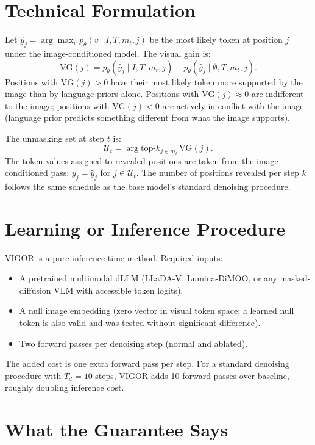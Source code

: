 \documentclass[10pt,twocolumn]{article}
\begin{document}
\section{Technical Formulation}

Let $\hat{y}_j = \arg\max_v p_\theta(v \mid I, T, m_t, j)$ be the most likely
token at position $j$ under the image-conditioned model. The visual gain is:
\[
  \text{VG}(j) = p_\theta(\hat{y}_j \mid I, T, m_t, j)
              - p_\theta(\hat{y}_j \mid \emptyset, T, m_t, j).
\]
Positions with $\text{VG}(j) > 0$ have their most likely token more supported
by the image than by language priors alone. Positions with $\text{VG}(j) \approx 0$
are indifferent to the image; positions with $\text{VG}(j) < 0$ are actively
in conflict with the image (language prior predicts something different from
what the image supports).

The unmasking set at step $t$ is:
\[
  \mathcal{U}_t = \arg\text{top-}k_{j \in m_t}\, \text{VG}(j).
\]
The token values assigned to revealed positions are taken from the
image-conditioned pass: $y_j = \hat{y}_j$ for $j \in \mathcal{U}_t$.
The number of positions revealed per step $k$ follows the same schedule as
the base model's standard denoising procedure.

\section{Learning or Inference Procedure}

VIGOR is a pure inference-time method. Required inputs:
\begin{itemize}[itemsep=2pt,parsep=0pt]
  \item A pretrained multimodal dLLM (LLaDA-V, Lumina-DiMOO, or any masked-
    diffusion VLM with accessible token logits).
  \item A null image embedding (zero vector in visual token space; a learned
    null token is also valid and was tested without significant difference).
  \item Two forward passes per denoising step (normal and ablated).
\end{itemize}
The added cost is one extra forward pass per step. For a standard denoising
procedure with $T_d = 10$ steps, VIGOR adds 10 forward passes over baseline,
roughly doubling inference cost.

\section{What the Guarantee Says}
\end{document}
